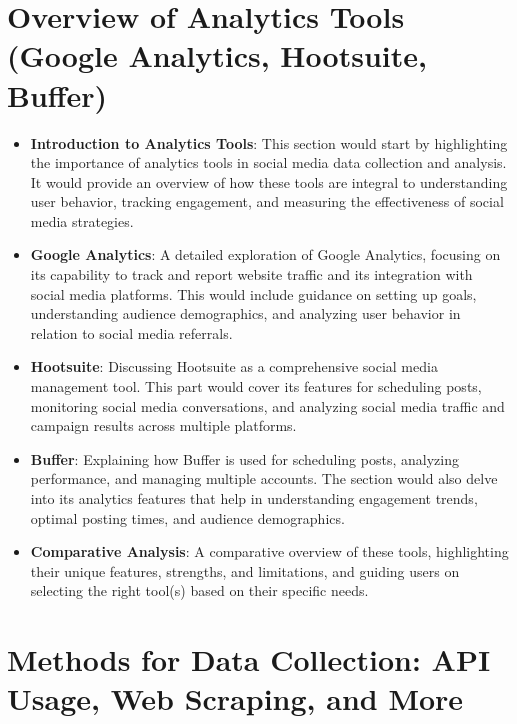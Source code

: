\documentclass[
]{book}
\providecommand{\tightlist}{%
  \setlength{\itemsep}{0pt}\setlength{\parskip}{0pt}}
\begin{document}
\hypertarget{overview-of-analytics-tools-google-analytics-hootsuite-buffer}{%
\section*{Overview of Analytics Tools (Google Analytics, Hootsuite, Buffer)}\label{overview-of-analytics-tools-google-analytics-hootsuite-buffer}}

\begin{itemize}
\tightlist
\item
  \textbf{Introduction to Analytics Tools}: This section would start by highlighting the importance of analytics tools in social media data collection and analysis. It would provide an overview of how these tools are integral to understanding user behavior, tracking engagement, and measuring the effectiveness of social media strategies.
\item
  \textbf{Google Analytics}: A detailed exploration of Google Analytics, focusing on its capability to track and report website traffic and its integration with social media platforms. This would include guidance on setting up goals, understanding audience demographics, and analyzing user behavior in relation to social media referrals.
\item
  \textbf{Hootsuite}: Discussing Hootsuite as a comprehensive social media management tool. This part would cover its features for scheduling posts, monitoring social media conversations, and analyzing social media traffic and campaign results across multiple platforms.
\item
  \textbf{Buffer}: Explaining how Buffer is used for scheduling posts, analyzing performance, and managing multiple accounts. The section would also delve into its analytics features that help in understanding engagement trends, optimal posting times, and audience demographics.
\item
  \textbf{Comparative Analysis}: A comparative overview of these tools, highlighting their unique features, strengths, and limitations, and guiding users on selecting the right tool(s) based on their specific needs.
\end{itemize}

\hypertarget{methods-for-data-collection-api-usage-web-scraping-and-more}{%
\section*{Methods for Data Collection: API Usage, Web Scraping, and More}\label{methods-for-data-collection-api-usage-web-scraping-and-more}}
\end{document}
